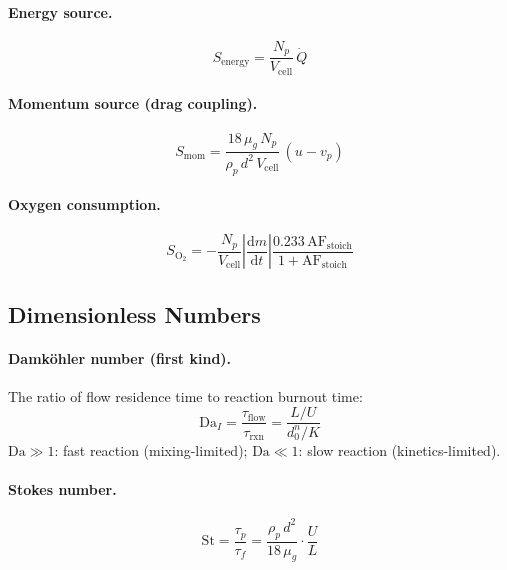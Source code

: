 \documentclass[11pt,a4paper]{article}
\begin{document}
\paragraph{Energy source.}
\begin{equation}\label{eq:S_energy}
  S_{\mathrm{energy}} = \frac{N_p}{V_{\mathrm{cell}}}\,\dot{Q}
\end{equation}

\paragraph{Momentum source (drag coupling).}
\begin{equation}\label{eq:S_mom}
  S_{\mathrm{mom}} = \frac{18\,\mu_g\,N_p}{\rho_p\,d^2\,V_{\mathrm{cell}}}
    \,(u - v_p)
\end{equation}

\paragraph{Oxygen consumption.}
\begin{equation}\label{eq:S_O2}
  S_{\mathrm{O}_2} = -\frac{N_p}{V_{\mathrm{cell}}}
    \left|\frac{\mathrm{d}m}{\mathrm{d}t}\right|
    \frac{0.233\,\mathrm{AF}_{\mathrm{stoich}}}{1 + \mathrm{AF}_{\mathrm{stoich}}}
\end{equation}

\subsection{Dimensionless Numbers}

\paragraph{Damk\"ohler number (first kind).}
The ratio of flow residence time to reaction burnout time:
\begin{equation}\label{eq:Da_I}
  \mathrm{Da}_I = \frac{\tau_{\mathrm{flow}}}{\tau_{\mathrm{rxn}}}
    = \frac{L / U}{d_0^{n} / K}
\end{equation}
$\mathrm{Da} \gg 1$: fast reaction (mixing-limited);
$\mathrm{Da} \ll 1$: slow reaction (kinetics-limited).

\paragraph{Stokes number.}
\begin{equation}\label{eq:St_comb}
  \mathrm{St} = \frac{\tau_p}{\tau_f}
    = \frac{\rho_p\,d^2}{18\,\mu_g} \cdot \frac{U}{L}
\end{equation}
\end{document}

